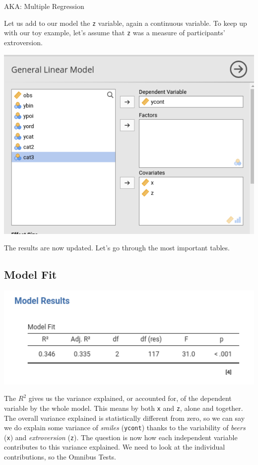 \documentclass[
]{book}
\begin{document}
\begin{flushright} AKA: Multiple Regression  \end{flushright}

Let us add to our model the \texttt{z} variable, again a continuous variable. To keep up with our toy example, let's assume that \texttt{z} was a measure of participants' extroversion.

\includegraphics[width=8.08in]{bookletpics/2_input4}

The results are now updated. Let's go through the most important tables.

\hypertarget{twofit2}{%
\subsection{Model Fit}\label{twofit2}}

\includegraphics[width=6.31in]{bookletpics/2_output6}

The \(R^2\) gives us the variance explained, or accounted for, of the dependent variable by the whole model. This means by both \texttt{x} and \texttt{z}, alone and together. The overall variance explained is statistically different from zero, so we can say we do explain some variance of \emph{smiles} (\texttt{ycont}) thanks to the variability of \emph{beers} (\texttt{x}) and \emph{extroversion} (\texttt{z}). The question is now how each independent variable contributes to this variance explained. We need to look at the individual contributions, so the {Omnibus Tests}.
\end{document}
